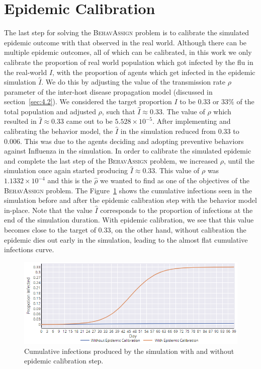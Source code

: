\documentclass[doublespace]{VTthesis}
\begin{document}
    \section{Epidemic Calibration}
    The last step for solving the \textsc{BehavAssign} problem is to calibrate the simulated epidemic outcome with that observed in the real world. Although there can be multiple epidemic outcomes, all of which can be calibrated, in this work we only calibrate the proportion of real world population which got infected by the flu in the real-world $I$, with the proportion of agents which get infected in the epidemic simulation $\hat{I}$. We do this by adjusting the value of the transmission rate $\rho$ parameter of the inter-host disease propagation model (discussed in section~\ref{sec:4.2}). We considered the target proportion $I$ to be $0.33$ or $33\%$ of the total population and adjusted $\rho$, such that $\hat{I} \approx 0.33$. The value of $\rho$ which resulted in $\hat{I} \approx 0.33$ came out to be $5.528 \times 10^{-5}$. After implementing and calibrating the behavior model, the $\hat{I}$ in the simulation reduced from $0.33$ to $0.006$. This was due to the agents deciding and adopting preventive behaviors against Influenza in the simulation. In order to calibrate the simulated epidemic and complete the last step of the \textsc{BehavAssign} problem, we increased $\rho$, until the simulation once again started producing $\hat{I} \approx 0.33$. This value of $\rho$ was $1.1332 \times 10^{-4}$ and this is the $\hat{\rho}$ we wanted to find as one of the objectives of the \textsc{BehavAssign} problem. The  Figure~\ref{fig:epicalib} shows the cumulative infections seen in the simulation before and after the epidemic calibration step with the behavior model in-place. Note that the value $\hat{I}$ corresponds to the proportion of infections at the end of the simulation duration. With epidemic calibration, we see that this value becomes close to the target of $0.33$, on the other hand, without calibration the epidemic dies out early in the simulation, leading to the almost flat cumulative infections curve. 
    
    \begin{figure}
    \centering
    \includegraphics[width=\textwidth]{figures/epicalib.png}
    \caption{Cumulative infections produced by the simulation with and without epidemic calibration step.}
    \label{fig:epicalib}
    \vspace{-0.1in}
    \end{figure}
    
\end{document}
